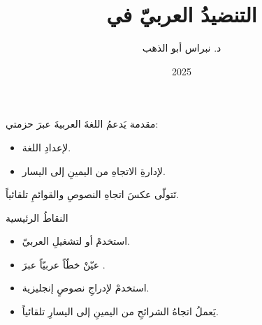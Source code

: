 \documentclass[aspectratio=169]{beamer}
\title{التنضيدُ العربيّ في \LR{Beamer}}
\author{د. نبراس أبو الذهب}
\institute{مركز نبراس}
\date{2025}
\begin{document}
\begin{frame}
  \titlepage
\end{frame}

\begin{frame}{مقدمة}
  يَدعمُ  اللغةَ العربيةَ عبرَ حزمتي:
  \begin{itemize}
    \item {} لإعدادِ اللغة.
    \item {} لإدارةِ الاتجاهِ من اليمينِ إلى اليسار.
  \end{itemize}
  تَتولّى  عكسَ اتجاهِ النصوصِ والقوائمِ تلقائياً.
\end{frame}

\begin{frame}{النقاطُ الرئيسية}
  \begin{itemize}
    \item استخدمْ  أو  لتشغيلِ  العربيّ.
    \item عيّنْ خطّاً عربيّاً عبرَ .
    \item استخدمْ  لإدراجِ نصوصٍ إنجليزية.
    \item يَعملُ اتجاهُ الشرائحِ من اليمينِ إلى اليسارِ تلقائياً.
  \end{itemize}
\end{frame}
\end{document}
